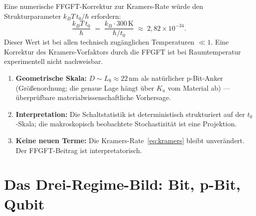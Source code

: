 	Eine numerische FFGFT-Korrektur zur Kramers-Rate würde den
	Strukturparameter $k_BT\,t_0/\hbar$ erfordern:
	\begin{equation}
		\frac{k_B T\,t_0}{\hbar}
		\;=\; \frac{k_B \cdot 300\,\text{K}}{\hbar/t_0}
		\;\approx\; 2{,}82 \times 10^{-34}.
		\label{eq:strukturparameter}
	\end{equation}
	Dieser Wert ist bei allen technisch zugänglichen Temperaturen
	$\ll 1$. Eine Korrektur des Kramers-Vorfaktors durch die FFGFT
	ist bei Raumtemperatur experimentell nicht nachweisbar.
	
	\begin{keypoint}
		\begin{enumerate}
			\item \textbf{Geometrische Skala:} $D \sim L_8 \approx 22\,\text{nm}$
			als natürlicher p-Bit-Anker (Größenordnung; die genaue Lage hängt
			über $K_u$ vom Material ab) --- überprüfbare materialwissenschaftliche
			Vorhersage.
			\item \textbf{Interpretation:} Die Schaltstatistik ist deterministisch
			strukturiert auf der $t_0$-Skala; die makroskopisch beobachtete
			Stochastizität ist eine Projektion.
			\item \textbf{Keine neuen Terme:} Die Kramers-Rate~\eqref{eq:kramers}
			bleibt unverändert. Der FFGFT-Beitrag ist interpretatorisch.
		\end{enumerate}
	\end{keypoint}
	
	\section{Das Drei-Regime-Bild: Bit, p-Bit, Qubit}
	\label{sec:drei-regime}
	
